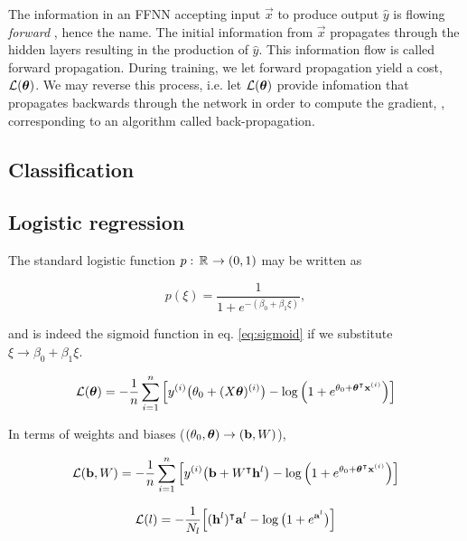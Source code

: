     The information in an FFNN accepting input $\vec{x}$ to produce output $\hat{y}$  is flowing \textit{forward} \citep{Goodfellow2016}, hence the name. The initial information from $\vec{x}$ propagates through the hidden layers resulting in the production of $\hat{y}$. This information flow is called forward propagation. During training, we let forward propagation yield a cost, $\mathcal{L}(\boldsymbol{\theta})$. We may reverse this process, i.e. let $\mathcal{L}(\boldsymbol{\theta})$ provide infomation that propagates backwards through the network in order to compute the gradient, , corresponding to an algorithm called back-propagation.


\subsection{Classification}\label{sec:classification}

\subsection{Logistic regression}\label{sec:logistic_regression}

The standard logistic function $p:\, \mathbb{R}^{} \to (0,1)$ may be written as 

\begin{equation}\label{eq:logistic_function}
    p(\xi) = \frac{1}{1+e^{-(\beta_0 + \beta_1\xi)}},
\end{equation}

and is indeed the sigmoid function in eq. \eqref{eq:sigmoid} if we substitute $\xi \to \beta_0 + \beta_1 \xi$. 
\fillertext





\begin{equation}\label{eq:logistic_cost_function}
    \mathcal{L}(\boldsymbol{\theta}) = -  \frac{1}{n}\sum_{i=1}^n \Big[ y^{(i)} \big(\theta_0 + (X\boldsymbol{\theta})^{(i)}\big) - \log{\Big(1+e^{\theta_0 + \boldsymbol{\theta}^\intercal\mathbf{x}^{(i)}}\Big)} \Big]
\end{equation}

In terms of weights and biases ($ (\theta_0,  \boldsymbol{\theta} ) \to (\mathbf{b}, W)$),

\begin{equation}\label{eq:logistic_cost_function_NN}
    \mathcal{L}(\mathbf{b}, W) = -  \frac{1}{n}\sum_{i=1}^n \Big[ y^{(i)} \big(\mathbf{b} + W^\intercal \mathbf{h}^{l}\big) - \log{\Big(1+e^{\theta_0 + \boldsymbol{\theta}^\intercal\mathbf{x}^{(i)}}\Big)} \Big]
\end{equation}

\begin{equation}\label{eq:logistic_cost_function_NN2}
    \mathcal{L}(l) = -  \frac{1}{N_l} \Big[ (\mathbf{h}^{l})^\intercal\mathbf{a}^{l} - \log{\big(1+e^{\mathbf{a}^{l}}\big)} \Big]
\end{equation}
